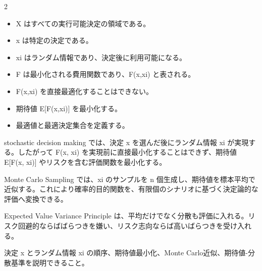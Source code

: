 \clearpage



\vspace{1.5mm}

\begin{multicols}{2}

\footnotesize

\raggedcolumns


\begin{itemize}
\item X はすべての実行可能決定の領域である。
\item x は特定の決定である。
\item xi はランダム情報であり、決定後に利用可能になる。
\item F は最小化される費用関数であり、F(x,xi) と表される。
\item F(x,xi) を直接最適化することはできない。
\item 期待値 E[F(x,xi)] を最小化する。
\item 最適値と最適決定集合を定義する。
\end{itemize}

stochastic decision making では、決定 x を選んだ後にランダム情報 xi が実現する。したがって F(x, xi) を実現前に直接最小化することはできず、期待値 E[F(x, xi)] やリスクを含む評価関数を最小化する。\par

Monte Carlo Sampling では、xi のサンプルを n 個生成し、期待値を標本平均で近似する。これにより確率的目的関数を、有限個のシナリオに基づく決定論的な評価へ変換できる。\par

Expected Value Variance Principle は、平均だけでなく分散も評価に入れる。リスク回避的ならばばらつきを嫌い、リスク志向ならば高いばらつきを受け入れる。\par

決定 x とランダム情報 xi の順序、期待値最小化、Monte Carlo近似、期待値-分散基準を説明できること。\par


\end{multicols}
